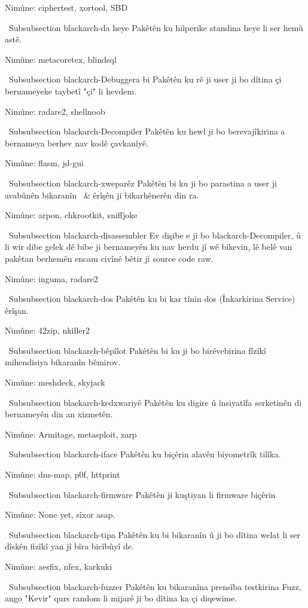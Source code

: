 Nimûne: ciphertest, xortool, SBD

\ Subsubsection {blackarch-da heye}
Pakêtên ku hilperike standina heye li ser hemû astê.

Nimûne: metacoretex, blindsql

\ Subsubsection {blackarch-Debuggera bi}
Pakêtên ku rê ji user ji bo dîtina çi bernameyeke taybetî "çi" li hevdem.

Nimûne: radare2, shellnoob

\ Subsubsection {blackarch-Decompiler}
Pakêtên ku hewl ji bo berevajîkirina a bernameya berhev nav kodê çavkanîyê.

Nimûne: flasm, jd-gui

\ Subsubsection {blackarch-xweparêz}
Pakêtên bi ku ji bo parastina a user ji avabûnên bikaranîn \ & êrîşên ji bikarhênerên din ra.

Nimûne: arpon, chkrootkit, sniffjoke

\ Subsubsection {blackarch-disassembler}
Ev dişibe e ji bo blackarch-Decompiler, û li wir dibe gelek dê bibe
ji bernameyên ku nav herdu jî wê bikevin, lê belê van pakêtan berhemên encam civînê
bêtir ji source code raw.

Nimûne: inguma, radare2

\ Subsubsection {blackarch-dos}
Pakêtên ku bi kar tînin dos (Înkarkirina Service) êrîşan.

Nimûne: 42zip, nkiller2

\ Subsubsection {blackarch-bêpîlot}
Pakêtên bi ku ji bo birêvebirina fîzîkî mihendisiya bikaranîn
bêmirov.

Nimûne: meshdeck, skyjack

\ Subsubsection {blackarch-kedxwariyê}
Pakêtên ku digire û însiyatîfa serketinên di bernameyên din an xizmetên.

Nimûne: Armitage, metasploit, zarp

\ Subsubsection {blackarch-iface}
Pakêtên ku biçêrin alavên biyometrîk tilîka.

Nimûne: dns-map, p0f, httprint

\ Subsubsection {blackarch-firmware}
Pakêtên ji kuştiyan li firmware biçêrin

Nimûne: None yet, sîxor asap.

\ Subsubsection {blackarch-tipa}
Pakêtên ku bi bikaranîn û ji bo dîtina welat li ser dîskên fizîkî yan jî bîra bicîbûyî de.

Nimûne: aesfix, nfex, karkuki

\ Subsubsection {blackarch-fuzzer}
Pakêtên ku bikaranîna prensîba testkirina Fuzz, ango
"Kevir" qurs random li mijarê ji bo dîtina ka çi diqewime.

